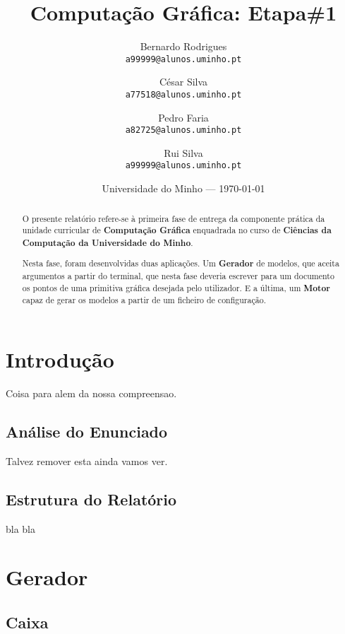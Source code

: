 \documentclass{article}
\title{Computação Gráfica: Etapa\#1} %
\author{Bernardo Rodrigues\\ \texttt{a99999@alunos.uminho.pt}\\ \and César Silva\\ \texttt{a77518@alunos.uminho.pt}\\ \and Pedro Faria\\ \texttt{a82725@alunos.uminho.pt} \and Rui Silva\\ \texttt{a99999@alunos.uminho.pt}\\} %
\date{Universidade do Minho --- \today} %
\begin{document}
\maketitle 
\newpage

\begin{abstract}
	O presente relatório refere-se à primeira fase de entrega da componente prática da unidade curricular de \textbf{Computação Gráfica} enquadrada no curso de \textbf{Ciências da Computação da Universidade do Minho}. \par
Nesta fase, foram desenvolvidas duas aplicações. Um \textbf{Gerador} de modelos, que aceita argumentos a partir do terminal, que nesta fase deveria escrever para um documento os pontos de uma primitiva gráfica desejada pelo utilizador. E a última, um \textbf{Motor} capaz de gerar os modelos a partir de um ficheiro de configuração.
\end{abstract}
\newpage


\tableofcontents{}
\newpage


\section{Introdução}

Coisa para alem da nossa compreensao.\\

\subsection{Análise do Enunciado}

Talvez remover esta ainda vamos ver.

\subsection{Estrutura do Relatório}

bla bla

\section{Gerador}

\subsection{Caixa}
\end{document}
